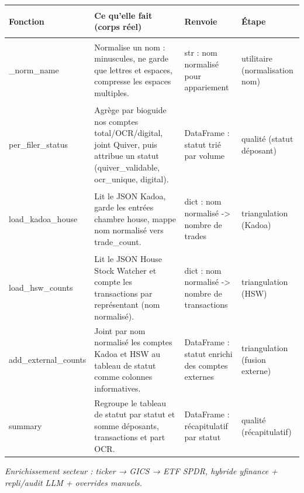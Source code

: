 \documentclass[11pt,a4paper]{article}
\makeatletter
\newenvironment{fnt}{%
  \par\footnotesize
  \setlength{\tabcolsep}{3pt}%
  \begin{longtable}{@{}>{\ttfamily\scriptsize\raggedright\arraybackslash}p{3.0cm} >{\raggedright\arraybackslash}p{7.5cm} >{\itshape\scriptsize\raggedright\arraybackslash}p{2.7cm} >{\scriptsize\raggedright\arraybackslash}p{1.85cm}@{}}
  \toprule
  \normalfont\bfseries\scriptsize Fonction & \bfseries\scriptsize Ce qu'elle fait (corps réel) &
  \normalfont\bfseries\scriptsize Renvoie & \normalfont\bfseries\scriptsize Étape\\
  \midrule\endhead
}{\bottomrule\end{longtable}\par}
\newcommand{\fnmod}[2]{\par\smallskip\noindent{\ttfamily\bfseries #1}\;\textmd{\itshape\small\textemdash{} #2}\par\nobreak\vspace{2pt}}
\makeatother
\begin{document}
\begin{fnt}
_\allowbreak norm_\allowbreak name & Normalise un nom : minuscules,\allowbreak{} ne garde que lettres et espaces,\allowbreak{} compresse les espaces multiples. & str : nom normalisé pour appariement & utilitaire (normalisation nom) \\
per_\allowbreak filer_\allowbreak status & Agrège par bioguide nos comptes total/\allowbreak{}OCR/\allowbreak{}digital,\allowbreak{} joint Quiver,\allowbreak{} puis attribue un statut (quiver_validable,\allowbreak{} ocr_unique,\allowbreak{} digital)\allowbreak{}. & DataFrame : statut trié par volume & qualité (statut déposant) \\
load_\allowbreak kadoa_\allowbreak house & Lit le JSON Kadoa,\allowbreak{} garde les entrées chambre house,\allowbreak{} mappe nom normalisé vers trade_count. & dict : nom normalisé -> nombre de trades & triangulation (Kadoa) \\
load_\allowbreak hsw_\allowbreak counts & Lit le JSON House Stock Watcher et compte les transactions par représentant (nom normalisé)\allowbreak{}. & dict : nom normalisé -> nombre de transactions & triangulation (HSW) \\
add_\allowbreak external_\allowbreak counts & Joint par nom normalisé les comptes Kadoa et HSW au tableau de statut comme colonnes informatives. & DataFrame : statut enrichi des comptes externes & triangulation (fusion externe) \\
summary & Regroupe le tableau de statut par statut et somme déposants,\allowbreak{} transactions et part OCR. & DataFrame : récapitulatif par statut & qualité (récapitulatif) \\
\end{fnt}
\fnmod{sector_enrich.py}{Enrichissement secteur : ticker → GICS → ETF SPDR, hybride yfinance + repli/audit LLM + overrides manuels.}
\end{document}
